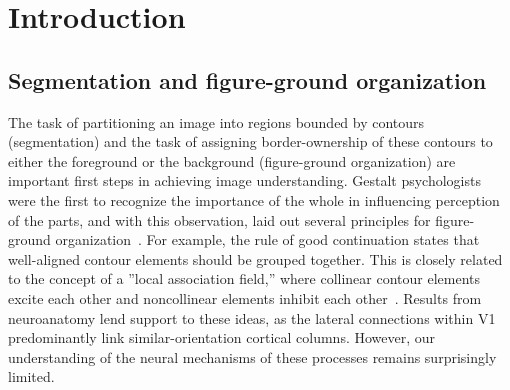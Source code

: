 \chapter{Introduction}
\label{sec:intro}


\section{Segmentation and figure-ground organization}
The task of partitioning an image into regions bounded by contours (segmentation) and the task of assigning border-ownership of these contours to either the foreground or the background (figure-ground organization) are important first steps in achieving image understanding. Gestalt psychologists were the first to recognize the importance of the whole in influencing perception of the parts, and with this observation, laid out several principles for figure-ground organization~\citep{Koffka35, Wertheimer23}. For example, the rule of good continuation states that well-aligned contour elements should be grouped together. This is closely related to the concept of a ''local association field,'' where collinear contour elements excite each other and noncollinear elements inhibit each other~\citep{Ullman92, Field_etal93}. Results from neuroanatomy lend support to these ideas, as the lateral connections within V1 predominantly link similar-orientation cortical columns. However, our understanding of the neural mechanisms of these processes remains surprisingly limited.
 
